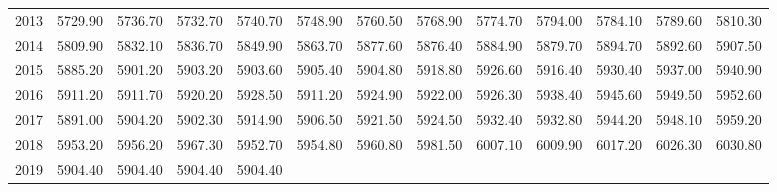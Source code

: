 \begin{longtable}{rrrrrrrrrrrrr}
  2013 & 5729.90 & 5736.70 & 5732.70 & 5740.70 & 5748.90 & 5760.50 & 5768.90 & 5774.70 & 5794.00 & 5784.10 & 5789.60 & 5810.30 \\ 
  2014 & 5809.90 & 5832.10 & 5836.70 & 5849.90 & 5863.70 & 5877.60 & 5876.40 & 5884.90 & 5879.70 & 5894.70 & 5892.60 & 5907.50 \\ 
  2015 & 5885.20 & 5901.20 & 5903.20 & 5903.60 & 5905.40 & 5904.80 & 5918.80 & 5926.60 & 5916.40 & 5930.40 & 5937.00 & 5940.90 \\ 
  2016 & 5911.20 & 5911.70 & 5920.20 & 5928.50 & 5911.20 & 5924.90 & 5922.00 & 5926.30 & 5938.40 & 5945.60 & 5949.50 & 5952.60 \\ 
  2017 & 5891.00 & 5904.20 & 5902.30 & 5914.90 & 5906.50 & 5921.50 & 5924.50 & 5932.40 & 5932.80 & 5944.20 & 5948.10 & 5959.20 \\ 
  2018 & 5953.20 & 5956.20 & 5967.30 & 5952.70 & 5954.80 & 5960.80 & 5981.50 & 6007.10 & 6009.90 & 6017.20 & 6026.30 & 6030.80 \\ 
  2019 & 5904.40 & 5904.40 & 5904.40 & 5904.40 &  &  &  &  &  &  &  &  \\ 
   \hline
\hline
\end{longtable}
